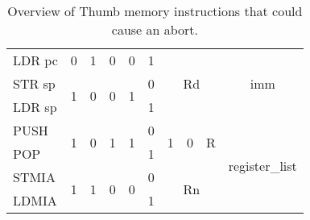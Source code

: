 \documentclass[a4paper,10pt]{report}
\begin{document}
\begin{table}[htb]
{\begin{tabular}{l|cccc|c|cc|cl|c|c|}
		\hline
		LDR pc    & 0                  & 1                  & 0                                       & \multicolumn{1}{c}{0} & 1                     & \multicolumn{3}{c|}{\multirow{3}{*}{Rd}}                                          & \multicolumn{3}{c|}{\multirow{3}{*}{imm}}                        \\ 
		\cline{1-6}
		STR sp    & \multirow{2}{*}{1} & \multirow{2}{*}{0} & \multirow{2}{*}{0}                      & \multirow{2}{*}{1}    & 0                     & \multicolumn{3}{c|}{}                                                             & \multicolumn{3}{c|}{}                                            \\ 
		\cline{1-1}\cline{6-6}
		LDR sp    &                    &                    &                                         &                       & 1                     & \multicolumn{3}{c|}{}                                                             & \multicolumn{3}{c|}{}                                            \\ 
		\hline
		PUSH      & \multirow{2}{*}{1} & \multirow{2}{*}{0} & \multirow{2}{*}{1}                      & \multirow{2}{*}{1}    & 0                     & \multirow{2}{*}{1} & \multirow{2}{*}{0} & \multicolumn{1}{c|}{\multirow{2}{*}{R}} & \multicolumn{3}{c|}{\multirow{4}{*}{register\_list}}             \\ 
		\cline{1-1}\cline{6-6}
		POP       &                    &                    &                                         &                       & 1                     &                    &                    & \multicolumn{1}{c|}{}                   & \multicolumn{3}{c|}{}                                            \\ 
		\cline{1-9}
		STMIA     & \multirow{2}{*}{1} & \multirow{2}{*}{1} & \multirow{2}{*}{0}                      & \multirow{2}{*}{0}    & 0                     & \multicolumn{3}{c|}{\multirow{2}{*}{Rn}}                                          & \multicolumn{3}{c|}{}                                            \\ 
		\cline{1-1}\cline{6-6}
		LDMIA     &                    &                    &                                         &                       & 1                     & \multicolumn{3}{c|}{}                                                             & \multicolumn{3}{c|}{}                                            \\
		\hline
		\end{tabular}}
		\caption{Overview of Thumb memory instructions that could cause an abort.}
	\end{table}
\end{document}
